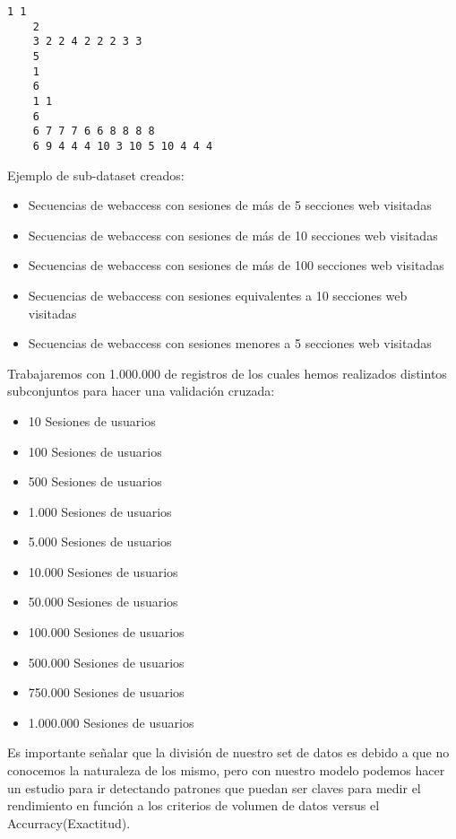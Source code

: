 	
	\begin{lstlisting}[frame=single,basicstyle=\ttfamily\tiny,]
	1 1 
	2 
	3 2 2 4 2 2 2 3 3 
	5 
	1 
	6 
	1 1 
	6 
	6 7 7 7 6 6 8 8 8 8 
	6 9 4 4 4 10 3 10 5 10 4 4 4 
	\end{lstlisting}


 Ejemplo de sub-dataset creados:

\begin{itemize}
	\item Secuencias de webaccess con sesiones de más de 5 secciones web visitadas
	\item Secuencias de webaccess con sesiones de más de 10 secciones web visitadas
	\item Secuencias de webaccess con sesiones de más de 100 secciones web visitadas
	\item Secuencias de webaccess con sesiones equivalentes a 10 secciones web visitadas
	\item Secuencias de webaccess con sesiones menores a 5 secciones web visitadas
\end{itemize}


Trabajaremos con 1.000.000 de registros de los cuales hemos realizados distintos subconjuntos para hacer una validación cruzada:

\begin{itemize}
	\item 10 Sesiones de usuarios
	\item 100 Sesiones de usuarios
	\item 500 Sesiones de usuarios
	\item 1.000 Sesiones de usuarios
	\item 5.000 Sesiones de usuarios
	\item 10.000 Sesiones de usuarios
	\item 50.000 Sesiones de usuarios
	\item 100.000 Sesiones de usuarios
	\item 500.000 Sesiones de usuarios
	\item 750.000 Sesiones de usuarios
	\item 1.000.000 Sesiones de usuarios
\end{itemize}


Es importante señalar que la división de nuestro set de datos es debido a que no conocemos la naturaleza de los mismo, pero con nuestro modelo podemos hacer un estudio para ir detectando patrones que puedan ser claves para medir el rendimiento en función a los criterios de volumen de datos versus el Accurracy(Exactitud).






